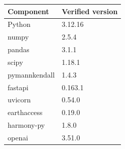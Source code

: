 \begin{center}\small
\begin{tabular}{@{}ll@{}}
\toprule
Component & Verified version \\
\midrule
Python & 3.12.16 \\
numpy & 2.5.4 \\
pandas & 3.1.1 \\
scipy & 1.18.1 \\
pymannkendall & 1.4.3 \\
fastapi & 0.163.1 \\
uvicorn & 0.54.0 \\
earthaccess & 0.19.0 \\
harmony-py & 1.8.0 \\
openai & 3.51.0 \\
\bottomrule
\end{tabular}
\end{center}
